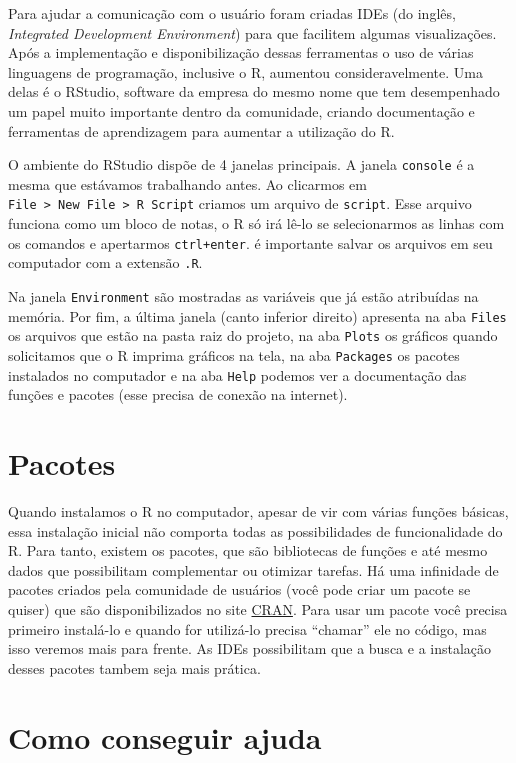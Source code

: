 \documentclass[]{book}
\theoremstyle{definition}
\theoremstyle{definition}
\theoremstyle{definition}
\theoremstyle{remark}
\begin{document}
Para ajudar a comunicação com o usuário foram criadas IDEs (do inglês, \emph{Integrated Development Environment}) para que facilitem algumas visualizações. Após a implementação e disponibilização dessas ferramentas o uso de várias linguagens de programação, inclusive o R, aumentou consideravelmente. Uma delas é o RStudio, software da empresa do mesmo nome que tem desempenhado um papel muito importante dentro da comunidade, criando documentação e ferramentas de aprendizagem para aumentar a utilização do R.

O ambiente do RStudio dispõe de 4 janelas principais. A janela \texttt{console} é a mesma que estávamos trabalhando antes. Ao clicarmos em \texttt{File\ \textgreater{}\ New\ File\ \textgreater{}\ R\ Script} criamos um arquivo de \texttt{script}. Esse arquivo funciona como um bloco de notas, o R só irá lê-lo se selecionarmos as linhas com os comandos e apertarmos \texttt{ctrl+enter}. é importante salvar os arquivos em seu computador com a extensão \texttt{.R}.

Na janela \texttt{Environment} são mostradas as variáveis que já estão atribuídas na memória. Por fim, a última janela (canto inferior direito) apresenta na aba \texttt{Files} os arquivos que estão na pasta raiz do projeto, na aba \texttt{Plots} os gráficos quando solicitamos que o R imprima gráficos na tela, na aba \texttt{Packages} os pacotes instalados no computador e na aba \texttt{Help} podemos ver a documentação das funções e pacotes (esse precisa de conexão na internet).

\hypertarget{pacotes}{%
\section{Pacotes}\label{pacotes}}

Quando instalamos o R no computador, apesar de vir com várias funções básicas, essa instalação inicial não comporta todas as possibilidades de funcionalidade do R. Para tanto, existem os pacotes, que são bibliotecas de funções e até mesmo dados que possibilitam complementar ou otimizar tarefas. Há uma infinidade de pacotes criados pela comunidade de usuários (você pode criar um pacote se quiser) que são disponibilizados no site \href{https://cran.r-project.org/}{CRAN}. Para usar um pacote você precisa primeiro instalá-lo e quando for utilizá-lo precisa ``chamar'' ele no código, mas isso veremos mais para frente. As IDEs possibilitam que a busca e a instalação desses pacotes tambem seja mais prática.

\hypertarget{como-conseguir-ajuda}{%
\section{Como conseguir ajuda}\label{como-conseguir-ajuda}}
\end{document}
